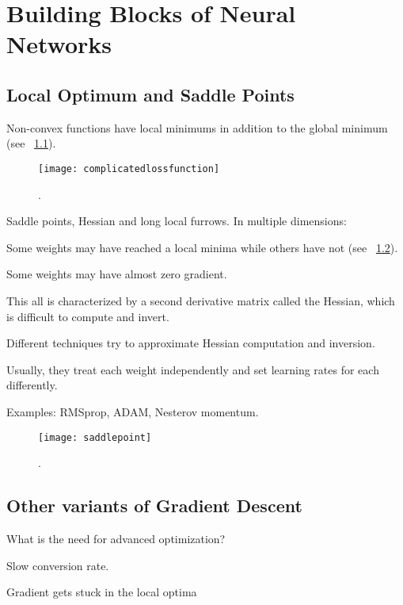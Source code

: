 	\chapter{Building Blocks of Neural Networks}

	\section{Local Optimum and Saddle Points}
Non-convex functions have local minimums in addition to the global minimum (see \figurename~\ref{fig:complicatedlossfunction}).
 	\begin{figure}[h]
		\centering
		\texttt{[image: complicatedlossfunction]}
		\caption{.}
		\label{fig:complicatedlossfunction}
	\end{figure}

Saddle points, Hessian and long local furrows.  In multiple dimensions:
	\begin{bulletedlist}
		\item Some weights may have reached a local minima while others have not (see \figurename~\ref{fig:saddlepoint}).
		\item Some weights may have almost zero gradient.
		\item This all is characterized by a second derivative matrix called the Hessian, which is difficult to compute and invert.
		\item Different techniques try to approximate Hessian computation and inversion.
		\item Usually, they treat each weight independently and set learning rates for each differently.
		\item Examples: RMSprop, ADAM, Nesterov momentum.
	\end{bulletedlist}
 	\begin{figure}[h]
		\centering
		\texttt{[image: saddlepoint]}
		\caption{.}
		\label{fig:saddlepoint}
	\end{figure}


	\section{Other variants of Gradient Descent}
What is the need for advanced optimization?
	\begin{bulletedlist}
		\item Slow conversion rate.
		\item Gradient gets stuck in the local optima
	\end{bulletedlist}

